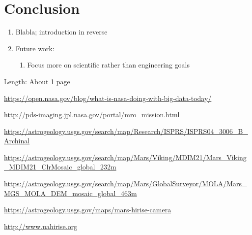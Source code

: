\documentclass[journal]{vgtc}                %
\begin{document}
\section{Conclusion} \label{sec:system}
\begin{enumerate}
  \item Blabla; introduction in reverse
  \item Future work:
  \begin{enumerate}
    \item Focus more on scientific rather than engineering goals
  \end{enumerate}
\end{enumerate}
Length: About 1 page


%

%
%
%



\begin{thebibliography}{99}

\url{https://open.nasa.gov/blog/what-is-nasa-doing-with-big-data-today/}

\url{http://pds-imaging.jpl.nasa.gov/portal/mro_mission.html}

\url{https://astrogeology.usgs.gov/search/map/Research/ISPRS/ISPRS04_3006_B_Archinal}

\url{https://astrogeology.usgs.gov/search/map/Mars/Viking/MDIM21/Mars_Viking_MDIM21_ClrMosaic_global_232m}

\url{https://astrogeology.usgs.gov/search/map/Mars/GlobalSurveyor/MOLA/Mars_MGS_MOLA_DEM_mosaic_global_463m}

\url{https://astrogeology.usgs.gov/maps/mars-hirise-camera}

\url{http://www.uahirise.org}

\end{thebibliography}
\end{document}
